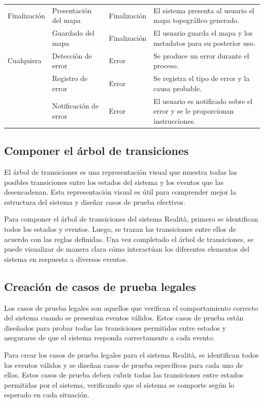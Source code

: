 \documentclass[12pt,a4paper, twoside]{article} %
\begin{document}
\begin{table}[htbp]
{\begin{tabular}{|p{2.5cm}|p{5cm}|p{3.5cm}|p{7cm}|}
Finalización & Presentación del mapa & Finalización & El sistema presenta al usuario el mapa topográfico generado. \\
 & Guardado del mapa & Finalización & El usuario guarda el mapa y los metadatos para su posterior uso. \\ \hline
Cualquiera & Detección de error & Error & Se produce un error durante el proceso. \\
 & Registro de error & Error & Se registra el tipo de error y la causa probable. \\
 & Notificación de error & Error & El usuario es notificado sobre el error y se le proporcionan instrucciones. \\ \hline
\end{tabular}%
}
\end{table}

\subsection{Componer el árbol de transiciones}
\label{sec:requisitos-especificos}

El árbol de transiciones es una representación visual que muestra todas las posibles transiciones entre los estados del sistema y los eventos que las desencadenan. Esta representación visual es útil para comprender mejor la estructura del sistema y diseñar casos de prueba efectivos.

Para componer el árbol de transiciones del sistema Realità, primero se identifican todos los estados y eventos. Luego, se trazan las transiciones entre ellos de acuerdo con las reglas definidas. Una vez completado el árbol de transiciones, se puede visualizar de manera clara cómo interactúan los diferentes elementos del sistema en respuesta a diversos eventos.



\subsection{Creación de casos de prueba legales}
\label{sec:requisitos-especificos}

Los casos de prueba legales son aquellos que verifican el comportamiento correcto del sistema cuando se presentan eventos válidos. Estos casos de prueba están diseñados para probar todas las transiciones permitidas entre estados y asegurarse de que el sistema responda correctamente a cada evento.

Para crear los casos de prueba legales para el sistema Realità, se identifican todos los eventos válidos y se diseñan casos de prueba específicos para cada uno de ellos. Estos casos de prueba deben cubrir todas las transiciones entre estados permitidas por el sistema, verificando que el sistema se comporte según lo esperado en cada situación.
\end{document}
